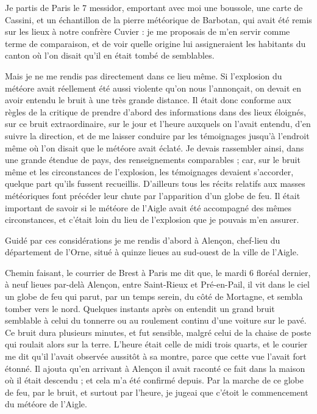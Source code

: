 \documentclass[a4paper, 11pt, oneside, polutonikogreek, french]{article}
\begin{document}
Je partis de Paris le 7 messidor, emportant avec moi une boussole, une carte de Cassini, et un échantillon de la pierre météorique de Barbotan, qui avait été remis sur les lieux à notre confrère Cuvier : je me proposais de m'en servir comme terme de comparaison, et de voir quelle origine lui assigneraient les habitants du canton où l'on disait qu'il en était tombé de semblables.

Mais je ne me rendis pas directement dans ce lieu même. Si l'explosion du météore avait réellement été aussi violente qu'on nous l'annonçait, on devait en avoir entendu le bruit à une très grande distance. Il était donc conforme aux règles de la critique de prendre d'abord des informations dans des lieux éloignés, sur ce bruit extraordinaire, sur le jour et l'heure auxquels on l'avait entendu, d'en suivre la direction, et de me laisser conduire par les témoignages jusqu'à l'endroit même où l'on disait que le météore avait éclaté. Je devais rassembler ainsi, dans une grande étendue de pays, des renseignements comparables ; car, sur le bruit même et les circonstances de l'explosion, les témoignages devaient s'accorder, quelque part qu'ils fussent recueillis. D'ailleurs tous les récits relatifs aux masses météoriques font précéder leur chute par l'apparition d'un globe de feu. Il était important de savoir si le météore de l'Aigle avait été accompagné des mêmes circonstances, et c'était loin du lieu de l'explosion que je pouvais m'en assurer.

Guidé par ces considérations je me rendis d'abord à Alençon, chef-lieu du département de l'Orne, situé à quinze lieues au sud-ouest de la ville de l'Aigle.

Chemin faisant, le courrier de Brest à Paris me dit que, le mardi 6 floréal dernier, à neuf lieues par-delà Alençon, entre Saint-Rieux et Pré-en-Pail, il vit dans le ciel un globe de feu qui parut, par un temps serein, du côté de Mortagne, et sembla tomber vers le nord. Quelques instants après on entendit un grand bruit semblable à celui du tonnerre ou au roulement continu d'une voiture sur le pavé. Ce bruit dura plusieurs minutes, et fut sensible, malgré celui de la chaise de poste qui roulait alors sur la terre. L'heure était celle de midi trois quarts, et le courier me dit qu'il l'avait observée aussitôt à sa montre, parce que cette vue l'avait fort étonné. Il ajouta qu'en arrivant à Alençon il avait raconté ce fait dans la maison où il était descendu ; et cela m'a été confirmé depuis. Par la marche de ce globe de feu, par le bruit, et surtout par l'heure, je jugeai que c'étoit le commencement du météore de l'Aigle.
\end{document}
